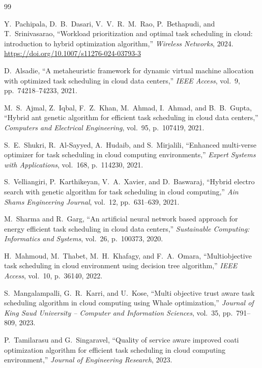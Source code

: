 \documentclass[journal]{IEEEtran}
\begin{document}
\begin{thebibliography}{99}

Y.~Pachipala, D.~B.~Dasari, V.~V.~R.~M.~Rao, P.~Bethapudi, and T.~Srinivasarao,
``Workload prioritization and optimal task scheduling in cloud: introduction to hybrid
optimization algorithm,'' \textit{Wireless Networks}, 2024.
\url{https://doi.org/10.1007/s11276-024-03793-3}

D.~Alsadie, ``A metaheuristic framework for dynamic virtual machine allocation with
optimized task scheduling in cloud data centers,'' \textit{IEEE Access}, vol.~9,
pp.~74218--74233, 2021.

M.~S.~Ajmal, Z.~Iqbal, F.~Z.~Khan, M.~Ahmad, I.~Ahmad, and B.~B.~Gupta, ``Hybrid ant
genetic algorithm for efficient task scheduling in cloud data centers,''
\textit{Computers and Electrical Engineering}, vol.~95, p.~107419, 2021.

S.~E.~Shukri, R.~Al-Sayyed, A.~Hudaib, and S.~Mirjalili, ``Enhanced multi-verse
optimizer for task scheduling in cloud computing environments,''
\textit{Expert Systems with Applications}, vol.~168, p.~114230, 2021.

S.~Velliangiri, P.~Karthikeyan, V.~A.~Xavier, and D.~Baswaraj, ``Hybrid electro
search with genetic algorithm for task scheduling in cloud computing,''
\textit{Ain Shams Engineering Journal}, vol.~12, pp.~631--639, 2021.

M.~Sharma and R.~Garg, ``An artificial neural network based approach for energy
efficient task scheduling in cloud data centers,''
\textit{Sustainable Computing: Informatics and Systems}, vol.~26, p.~100373, 2020.

H.~Mahmoud, M.~Thabet, M.~H.~Khafagy, and F.~A.~Omara, ``Multiobjective task
scheduling in cloud environment using decision tree algorithm,''
\textit{IEEE Access}, vol.~10, p.~36140, 2022.

S.~Mangalampalli, G.~R.~Karri, and U.~Kose, ``Multi objective trust aware task
scheduling algorithm in cloud computing using Whale optimization,''
\textit{Journal of King Saud University -- Computer and Information Sciences},
vol.~35, pp.~791--809, 2023.

P.~Tamilarasu and G.~Singaravel, ``Quality of service aware improved coati optimization
algorithm for efficient task scheduling in cloud computing environment,''
\textit{Journal of Engineering Research}, 2023.


\end{thebibliography}
\end{document}
